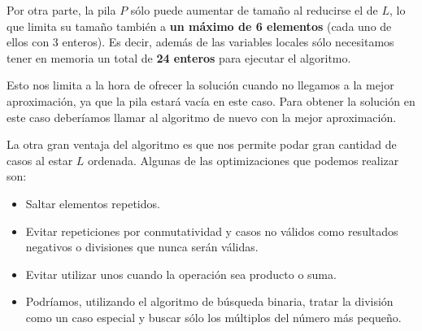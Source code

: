 Por otra parte, la pila $P$ sólo puede aumentar de tamaño al
reducirse el de $L$, lo que limita su tamaño también a
\textbf{un máximo de 6 elementos} (cada uno de ellos con 3
enteros). Es decir, además de las variables locales sólo
necesitamos tener en memoria un total de \textbf{24 enteros}
para ejecutar el algoritmo.

Esto nos limita a la hora de ofrecer la solución cuando no llegamos
a la mejor aproximación, ya que la pila estará vacía en este
caso. Para obtener la solución en este caso deberíamos llamar
al algoritmo de nuevo con la mejor aproximación.

La otra gran ventaja del algoritmo es que nos permite podar gran
cantidad de casos al estar $L$ ordenada. Algunas de las optimizaciones
que podemos realizar son:

\begin{itemize}
	\item Saltar elementos repetidos.
	\item Evitar repeticiones por conmutatividad y casos no válidos
	como resultados negativos o divisiones que nunca serán válidas.
	\item Evitar utilizar unos cuando la operación sea producto o suma.
	\item Podríamos, utilizando el algoritmo de búsqueda binaria,
	tratar la división como un caso especial y buscar sólo los múltiplos
	del número más pequeño.
\end{itemize}
